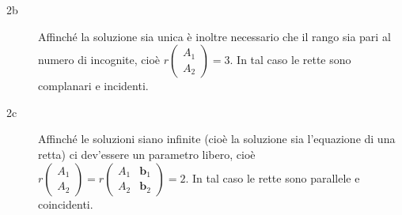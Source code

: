 \documentclass{article}
\begin{document}
\begin{description}
\item[2b] Affinch\'{e} la soluzione sia unica \`{e} inoltre necessario che
il rango sia pari al numero di incognite, cio\`{e} $r\left( 
\begin{array}{c}
A_{1} \\ 
A_{2}%
\end{array}%
\right) =3$. In tal caso le rette sono complanari e incidenti.

\item[2c] Affinch\'{e} le soluzioni siano infinite (cio\`{e} la soluzione
sia l'equazione di una retta) ci dev'essere un parametro libero, cio\`{e} $%
r\left( 
\begin{array}{c}
A_{1} \\ 
A_{2}%
\end{array}%
\right) =r\left( 
\begin{array}{cc}
A_{1} & \mathbf{b}_{1} \\ 
A_{2} & \mathbf{b}_{2}%
\end{array}%
\right) =2$. In tal caso le rette sono parallele e coincidenti.
\end{description}
\end{document}
